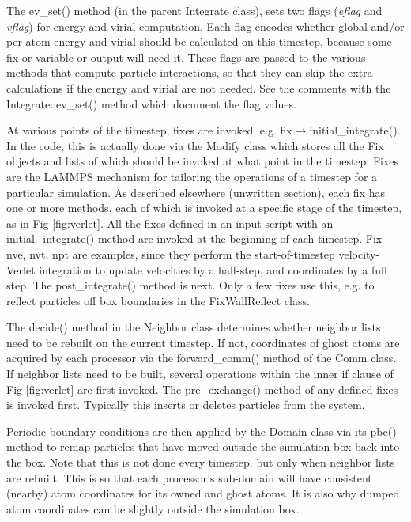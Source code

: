 \documentclass{article}
\begin{document}
The ev\_set() method (in the parent Integrate class), sets two flags
({\em eflag} and {\em vflag}) for energy and virial computation.  Each
flag encodes whether global and/or per-atom energy and virial should
be calculated on this timestep, because some fix or variable or output
will need it.  These flags are passed to the various methods that
compute particle interactions, so that they can skip the extra
calculations if the energy and virial are not needed.  See the
comments with the Integrate::ev\_set() method which document the flag
values.

At various points of the timestep, fixes are invoked,
e.g. fix$\rightarrow$initial\_integrate().  In the code, this is
actually done via the Modify class which stores all the Fix objects
and lists of which should be invoked at what point in the timestep.
Fixes are the LAMMPS mechanism for tailoring the operations of a
timestep for a particular simulation.  As described elsewhere
(unwritten section), each fix has one or more methods, each of which
is invoked at a specific stage of the timestep, as in Fig
\ref{fig:verlet}.  All the fixes defined in an input script with an
initial\_integrate() method are invoked at the beginning of each
timestep.  Fix nve, nvt, npt are examples, since they perform the
start-of-timestep velocity-Verlet integration to update velocities by
a half-step, and coordinates by a full step.  The post\_integrate()
method is next.  Only a few fixes use this, e.g. to reflect particles
off box boundaries in the FixWallReflect class.

The decide() method in the Neighbor class determines whether neighbor
lists need to be rebuilt on the current timestep.  If not, coordinates
of ghost atoms are acquired by each processor via the forward\_comm()
method of the Comm class.  If neighbor lists need to be built, several
operations within the inner if clause of Fig \ref{fig:verlet} are
first invoked.  The pre\_exchange() method of any defined fixes is
invoked first.  Typically this inserts or deletes particles from the
system.

Periodic boundary conditions are then applied by the Domain class via
its pbc() method to remap particles that have moved outside the
simulation box back into the box.  Note that this is not done every
timestep. but only when neighbor lists are rebuilt.  This is so that
each processor's sub-domain will have consistent (nearby) atom
coordinates for its owned and ghost atoms.  It is also why dumped atom
coordinates can be slightly outside the simulation box.
\end{document}
